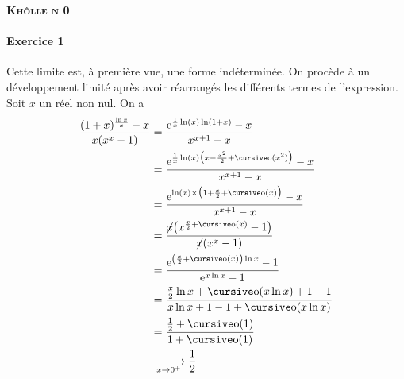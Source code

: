 \documentclass[a4paper]{article}
\begin{document}
	\begin{center}
		\bfseries\scshape\Huge Khôlle n 0
	\end{center}

	\paragraph{Exercice 1}
	Cette limite est, à première vue, une forme indéterminée. On procède à un développement limité après avoir réarrangés les différents termes de l'expression. Soit $x$ un réel non nul.
	On a
	\begin{align*}
		\frac{(1+x)^{\frac{\ln x}{x}}-x}{x(x^x - 1)} &= \frac{\mathrm{e}^{\frac{1}{x}\ln(x)\ln(1+x)} - x}{x^{x+1} - x} \\
		&= \frac{\mathrm{e}^{\frac{1}{x}\ln(x)\big(x - \frac{x^2}{2} + \po(x^2)\big)} - x}{x^{x+1} - x} \\
		&= \frac{\mathrm{e}^{\ln(x)\times \big(1 + \frac{x}{2}+\po(x)\big)} - x}{x^{x+1} - x} \\
		&= \frac{\cancel x\big(x^{\frac{x}{2} + \po(x)} - 1\big)}{\cancel x(x^x - 1)} \\
		&= \frac{\mathrm{e}^{\left( \frac{x}{2} + \po(x) \right) \ln x} - 1}{\mathrm{e}^{x \ln x} - 1} \\
		&= \frac{\frac{x}{2} \ln x + \po(x \ln x) + 1 - 1}{x \ln x + 1 - 1 + \po(x \ln x)} \\
		&= \frac{\frac{1}{2} + \po(1)}{1+ \po(1)} \\
		&\tendsto{x\to 0^+} \frac{1}{2} \\
	\end{align*}
	\bigskip
	\bigskip
\end{document}
